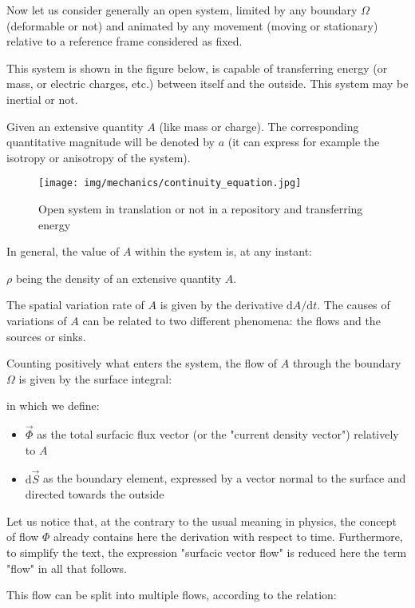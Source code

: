 	Now let us consider generally an open system, limited by any boundary $\Omega$ (deformable or not) and animated by any movement (moving or stationary) relative to a reference frame considered as fixed.

	This system is shown in the figure below, is capable of transferring energy (or mass, or electric charges, etc.) between itself and the outside. This system may be inertial or not.

	Given an extensive quantity $A$ (like mass or charge). The corresponding quantitative magnitude will be denoted by $a$ (it can express for example the isotropy or anisotropy of the system).
	\begin{figure}[H]
		\centering
		\texttt{[image: img/mechanics/continuity\_equation.jpg]}
		\caption[]{Open system in translation or not in a repository and transferring energy}
	\end{figure}
	In general, the value of $A$ within the system is, at any instant:
	
	$\rho$ being the density of an extensive quantity $A$.

	The spatial variation rate of $A$ is given by the derivative $\mathrm{d}A / \mathrm{d}t$. The causes of variations of $A$ can be related to two different phenomena: the flows and the sources or sinks.

	Counting positively what enters the system, the flow of $A$ through the boundary $\Omega$ is given by the surface integral:

	in which we define:
	\begin{itemize}
		\item $\vec{\Phi}$ as the total surfacic flux vector (or the "current density vector") relatively to $A$

		\item $\mathrm{d}\vec{S}$ as the boundary element, expressed by a vector normal to the surface and directed towards the outside
	\end{itemize}
	
	Let us notice that, at the contrary to the usual meaning in physics, the concept of flow $\Phi$ already contains here the derivation with respect to time. Furthermore, to simplify the text, the expression "surfacic vector flow" is reduced here the term "flow" in all that follows.

	This flow can be split into multiple flows, according to the relation:
	
